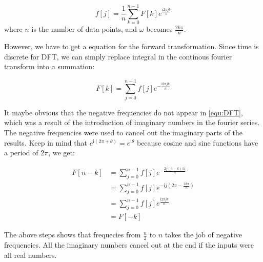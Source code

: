 \documentclass[12pt]{article}
\begin{document}
\begin{equation}
    f[j] = \frac{1}{n} \sum_{k=0}^{n-1} F[k] e^{\frac{\mathrm{i}2\pi jk}{n}} 
    \label{equ:IDFT}
\end{equation}
where $n$ is the number of data points, and $\omega$ becomes $\frac{2k\pi}{n}$. 


However, we have to get a equation for the forward transformation. 
Since time is discrete for DFT, 
we can simply replace integral in the continous fourier transform into a summation:

\begin{equation}
    F[k] = \sum_{j=0}^{n-1} f[j] e^{-\frac{\mathrm{i}2\pi jk}{n}} 
    \label{equ:DFT}
\end{equation}

It maybe obvious that the negative frequencies do not appear in \eqref{equ:DFT}, 
which was a result of the introduction of imaginary numbers in the fourier series. 
The negative frequencies were used to cancel out the imaginary parts of the results. 
Keep in mind that $e^{\mathrm{i}(2\pi+\theta)} = e^{\mathrm{i}\theta}$ 
because cosine and sine functions have a period of $2\pi$, we get:

$$\begin{aligned}
    F[n-k] 
    &= \sum_{j=0}^{n-1} f[j] e^{-\frac{2j(n-k)\pi\mathrm{i}}{n}} \\ 
    &= \sum_{j=0}^{n-1} f[j] e^{-\mathrm{i}j(2\pi - \frac{2k\pi}{n})} \\ 
    &= \sum_{j=0}^{n-1} f[j] e^{\frac{\mathrm{i}2\pi jk} {n}}   \\
    &= F[-k] 
\end{aligned}$$

The above steps shows that frequecies from $\frac{n}{2}$ to $n$ takes the job of negative frequencies. 
All the imaginary numbers cancel out at the end if the inputs were all real numbers. 
\end{document}
